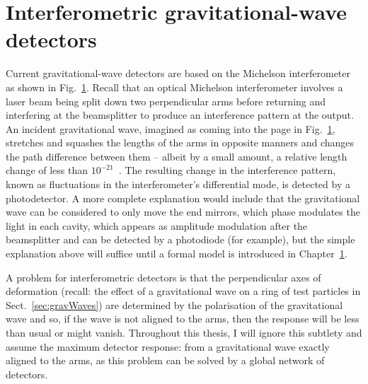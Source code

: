 \section{Interferometric gravitational-wave detectors}

Current gravitational-wave detectors are based on the Michelson interferometer as shown in Fig.~\ref{}. Recall that an optical Michelson interferometer involves a laser beam being split down two perpendicular arms before returning and interfering at the beamsplitter to produce an interference pattern at the output. 
An incident gravitational wave, imagined as coming into the page in Fig.~\ref{}, stretches and squashes the lengths of the arms in opposite manners and changes the path difference between them -- albeit by a small amount, a relative length change of less than $10^{-21}$~\cite{}. The resulting change in the interference pattern, known as fluctuations in the interferometer's differential mode, is detected by a photodetector.
A more complete explanation would include that the gravitational wave can be considered to only move the end mirrors, which phase modulates the light in each cavity, which appears as amplitude modulation after the beamsplitter and can be detected by a photodiode (for example), but the simple explanation above will suffice until a formal model is introduced in Chapter~\ref{}.  


A problem for interferometric detectors is that the perpendicular axes of deformation (recall: the effect of a gravitational wave on a ring of test particles in Sect.~\ref{sec:gravWaves}) are determined by the polarisation of the gravitational wave and so, if the wave is not aligned to the arms, then the response will be less than usual or might vanish. Throughout this thesis, I will ignore this subtlety and assume the maximum detector response: from a gravitational wave exactly aligned to the arms, as this problem can be solved by a global network of detectors. %

